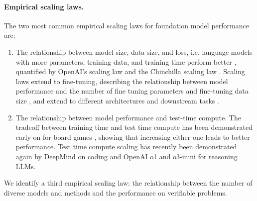 \paragraph{Empirical scaling laws.}
The two most common empirical scaling laws for foundation model performance are:
\begin{enumerate}
\item The relationship between model size, data size, and loss, i.e. language models with more parameters, training data, and training time perform better \cite{brown2020language}, quantified by OpenAI's scaling law \cite{kaplan2020scaling} and the Chinchilla scaling law \cite{hoffmann2022training}. Scaling laws extend to fine-tuning, describing the relationship between model performance and the number of fine tuning parameters and fine-tuning data size \cite{zhang2024scaling}, and extend to different architectures and downstream tasks \cite{caballero2022broken}. %
\item The relationship between model performance and test-time compute. The tradeoff between training time and test time compute has been demonstrated early on for board games \cite{jones2021scaling}, showing that increasing either one leads to better performance. Test time compute scaling \cite{sardana2023beyond} has recently been demonstrated again by DeepMind on coding \cite{alphacode2techreport} and OpenAI o1 \cite{strawberry} and o3-mini \cite{o3mini} for reasoning LLMs.
\end{enumerate}
We identify a third empirical scaling law: the relationship between the number of diverse models and methods and the performance on verifiable problems.

